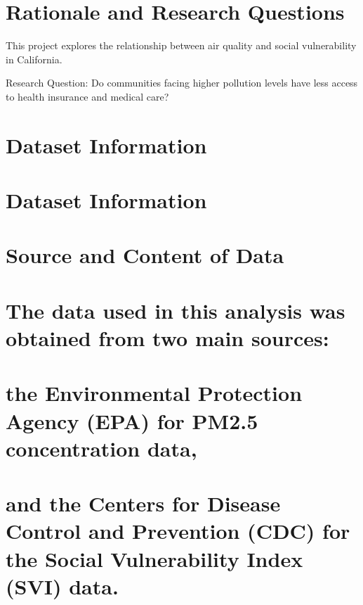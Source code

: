 \documentclass[
]{article}
\author{}
\date{\vspace{-2.5em}}
\begin{document}
\newpage
\tableofcontents 
\newpage
\listoftables 
\newpage
\listoffigures 
\newpage

\section{Rationale and Research
Questions}\label{rationale-and-research-questions}

This project explores the relationship between air quality and social
vulnerability in California.

Research Question: Do communities facing higher pollution levels have
less access to health insurance and medical care?

\newpage

\section{Dataset Information}\label{dataset-information}

\section{Dataset Information}\label{dataset-information-1}

\section{Source and Content of Data}\label{source-and-content-of-data}

\section{The data used in this analysis was obtained from two main
sources:}\label{the-data-used-in-this-analysis-was-obtained-from-two-main-sources}

\section{the Environmental Protection Agency (EPA) for PM2.5
concentration
data,}\label{the-environmental-protection-agency-epa-for-pm2.5-concentration-data}

\section{and the Centers for Disease Control and Prevention (CDC) for
the Social Vulnerability Index (SVI)
data.}\label{and-the-centers-for-disease-control-and-prevention-cdc-for-the-social-vulnerability-index-svi-data.}
\end{document}
